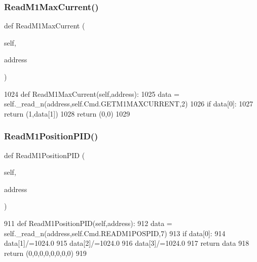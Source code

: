 \subsubsection{\texorpdfstring{Read\+M1\+Max\+Current()}{ReadM1MaxCurrent()}}
{\footnotesize\ttfamily def Read\+M1\+Max\+Current (\begin{DoxyParamCaption}\item[{}]{self,  }\item[{}]{address }\end{DoxyParamCaption})}


\begin{DoxyCode}
1024     \textcolor{keyword}{def }ReadM1MaxCurrent(self,address):
1025         data = self.\_read\_n(address,self.Cmd.GETM1MAXCURRENT,2)
1026         \textcolor{keywordflow}{if} data[0]:
1027             \textcolor{keywordflow}{return} (1,data[1])
1028         \textcolor{keywordflow}{return} (0,0)
1029 
\end{DoxyCode}
\mbox{\label{classtoxic__hardware_1_1roboclaw__3_1_1Roboclaw_a570e8879933adbcb33e90eb45091fc31}} 
\subsubsection{\texorpdfstring{Read\+M1\+Position\+P\+I\+D()}{ReadM1PositionPID()}}
{\footnotesize\ttfamily def Read\+M1\+Position\+P\+ID (\begin{DoxyParamCaption}\item[{}]{self,  }\item[{}]{address }\end{DoxyParamCaption})}


\begin{DoxyCode}
911     \textcolor{keyword}{def }ReadM1PositionPID(self,address):
912         data = self.\_read\_n(address,self.Cmd.READM1POSPID,7)
913         \textcolor{keywordflow}{if} data[0]:
914             data[1]/=1024.0
915             data[2]/=1024.0
916             data[3]/=1024.0
917             \textcolor{keywordflow}{return} data
918         \textcolor{keywordflow}{return} (0,0,0,0,0,0,0,0)
919         
\end{DoxyCode}
\mbox{\label{classtoxic__hardware_1_1roboclaw__3_1_1Roboclaw_a7d6b9aed2767ac9e9a7df14cde48efe8}} 
